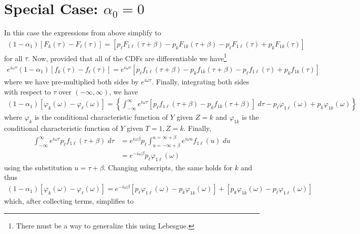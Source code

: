 \documentclass[12pt]{article}
\begin{document}
\section{Special Case: $\alpha_0 = 0$}
In this case the expressions from above simplify to
\begin{align}
  (1 - \alpha_1)\left[ F_k(\tau) - F_\ell(\tau)\right] = \left[ p_\ell F_{1\ell}(\tau + \beta) 
 - p_k  F_{1k}(\tau+ \beta) 
 - p_\ell F_{1\ell}(\tau) 
 + p_k F_{1k}(\tau) \right]
 \label{eq:specialCDF}
\end{align}
for all $\tau$.
Now, provided that all of the CDFs are differentiable we have\footnote{There must be a way to generalize this using Lebesgue.}
\begin{align*}
  e^{i\omega \tau}(1 - \alpha_1)\left[f_k(\tau) - f_\ell(\tau)\right] = e^{i\omega \tau}\left[ p_\ell f_{1\ell}(\tau + \beta) - p_k  f_{1k}(\tau+ \beta) - p_\ell f_{1\ell}(\tau) + p_k f_{1k}(\tau) \right]
\end{align*}
where we have pre-multiplied both sides by $e^{i\omega \tau}$.
Finally, integrating both sides with respect to $\tau$ over $(-\infty, \infty)$, we have
\begin{align*}
  (1 - \alpha_1)\left[\varphi_k(\omega) - \varphi_\ell(\omega)\right] = \left\{  \int_{-\infty}^{\infty} e^{i\omega \tau} \left[p_\ell f_{1\ell}(\tau + \beta) - p_k f_{1k}(\tau+ \beta)\right] \; d\tau - p_\ell \varphi_{1\ell}(\omega) + p_k \varphi_{1k}(\omega) \right\}
\end{align*}
where $\varphi_k$ is the conditional characteristic function of $Y$ given $Z=k$ and $\varphi_{1k}$ is the conditional characteristic function of $Y$ given $T=1, Z=k$.
Finally, 
\begin{align*}
  \int_{-\infty}^{\infty} e^{i\omega \tau} p_\ell f_{1\ell}(\tau + \beta) \; d\tau &=  e^{ i\omega \beta } p_\ell \int_{u = -\infty + \beta}^{u = \infty + \beta} e^{ i\omega u }f_{1\ell}(u)\; du \\
  &= e^{-i\omega \beta } p_\ell \varphi_{1\ell}(\omega)
\end{align*}
using the substitution $u = \tau + \beta$.
Changing subscripts, the same holds for $k$ and thus
\begin{align*}
  (1 - \alpha_1)\left[\varphi_k(\omega) - \varphi_\ell(\omega)\right] =  e^{-i\omega \beta}\left[ p_\ell \varphi_{1\ell}(\omega) - p_k \varphi_{1k}(\omega) \right] +  \left[p_k \varphi_{1k}(\omega) -  p_\ell \varphi_{1\ell}(\omega)\right]
\end{align*}
which, after collecting terms, simplifies to
\end{document}
